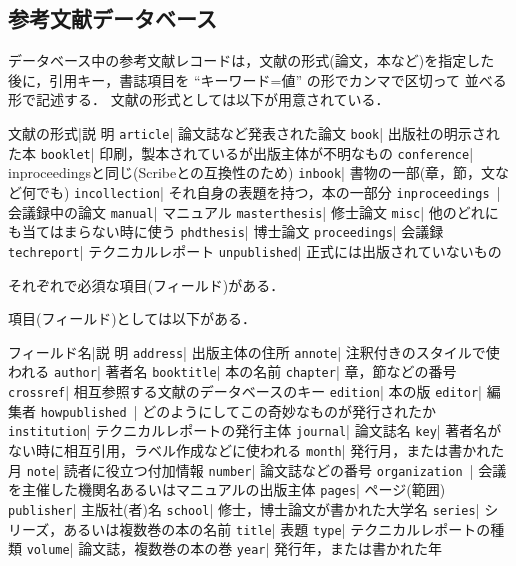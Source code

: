 \subsection{参考文献データベース}
データベース中の参考文献レコードは，文献の形式(論文，本など)を指定した
後に，引用キー，書誌項目を ``キーワード=値'' の形でカンマで区切って
並べる形で記述する\cite{latex,btxdoc}．
\newpage
文献の形式としては以下が用意されている．
\begin{table}[h]
\begintable
{\dg 文献の形式}|{\dg 説\hskip2cm 明}\hfil\crthick
{\tt article}\hfill| 論文誌など発表された論文\hfill\cr
{\tt book}\hfill | 出版社の明示された本\hfill\cr
{\tt booklet}\hfill | 印刷，製本されているが出版主体が不明なもの\hfill\cr
{\tt conference}\hfill | inproceedingsと同じ(Scribeとの互換性のため)\hfill\cr
{\tt inbook}\hfill | 書物の一部(章，節，文など何でも)\hfill\cr
{\tt incollection}\hfill | それ自身の表題を持つ，本の一部分\hfill\cr
{\tt inproceedings\ }\hfill | 会議録中の論文\hfill\cr
{\tt manual}\hfill | マニュアル\hfill\cr
{\tt masterthesis}\hfill | 修士論文\hfill\cr
{\tt misc}\hfill | 他のどれにも当てはまらない時に使う\hfill\cr
{\tt phdthesis}\hfill | 博士論文\hfill\cr
{\tt proceedings}\hfill | 会議録\hfill\cr
{\tt techreport}\hfill | テクニカルレポート\hfill\cr
{\tt unpublished}\hfill | 正式には出版されていないもの\hfill\endtable
\end{table}

それぞれで必須な項目(フィールド)がある．

項目(フィールド)としては以下がある．
\begin{table}[h]
\begintable
{\dg フィールド名}|{\dg 説\hskip2cm 明}\hfil\crthick
{\tt address}\hfill | 出版主体の住所\hfill\cr
{\tt annote}\hfill | 注釈付きのスタイルで使われる\hfill\cr
{\tt author}\hfill | 著者名\hfill\cr
{\tt booktitle}\hfill | 本の名前\hfill\cr
{\tt chapter}\hfill | 章，節などの番号\hfill\cr
{\tt crossref}\hfill | 相互参照する文献のデータベースのキー\hfill\cr
{\tt edition}\hfill | 本の版\hfill\cr
{\tt editor}\hfill | 編集者\hfill\cr
{\tt howpublished\ }\hfill | どのようにしてこの奇妙なものが発行されたか\hfill\cr
{\tt institution}\hfill | テクニカルレポートの発行主体\hfill\cr
{\tt journal}\hfill | 論文誌名\hfill\cr
{\tt key}\hfill | 著者名がない時に相互引用，ラベル作成などに使われる\hfill\cr
{\tt month}\hfill | 発行月，または書かれた月\hfill\cr
{\tt note}\hfill | 読者に役立つ付加情報\hfill\cr
{\tt number}\hfill | 論文誌などの番号\hfill\cr
{\tt organization\ }\hfill | 会議を主催した機関名あるいはマニュアルの出版主体\hfill\cr
{\tt pages}\hfill | ページ(範囲)\hfill\cr
{\tt publisher}\hfill | 主版社(者)名\hfill\cr
{\tt school}\hfill | 修士，博士論文が書かれた大学名\hfill\cr
{\tt series}\hfill | シリーズ，あるいは複数巻の本の名前\hfill\cr
{\tt title}\hfill | 表題\hfill\cr
{\tt type}\hfill | テクニカルレポートの種類\hfill\cr
{\tt volume}\hfill | 論文誌，複数巻の本の巻\hfill\cr
{\tt year}\hfill | 発行年，または書かれた年\hfill\endtable
\end{table}
\newpage

